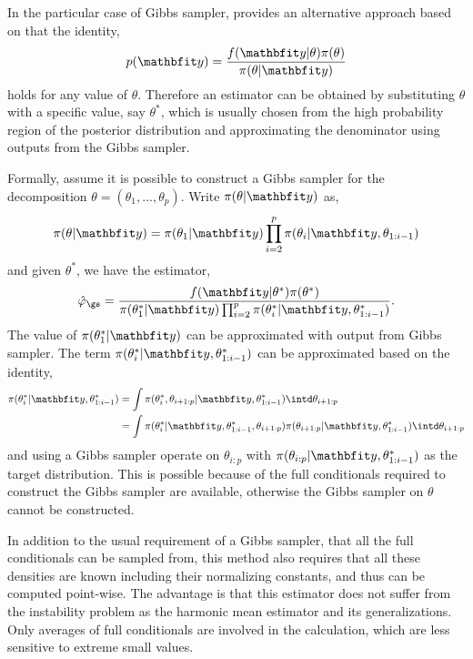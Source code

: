 In the particular case of Gibbs sampler, \cite{Chib:1995em} provides an
alternative approach based on that the identity,
\begin{equation}
  p(\data) = \frac{f(\data|\theta)\pi(\theta)}{\pi(\theta|\data)}
\end{equation}
holds for any value of $\theta$. Therefore an estimator can be obtained by
substituting $\theta$ with a specific value, say $\theta^*$, which is usually
chosen from the high probability region of the posterior distribution and
approximating the denominator using outputs from the Gibbs sampler.

Formally, assume it is possible to construct a Gibbs sampler for the
decomposition $\theta = (\theta_1,\dots,\theta_p)$. Write $\pi(\theta|\data)$
as,
\begin{equation}
  \pi(\theta|\data) = \pi(\theta_1|\data)
  \prod_{i=2}^p\pi(\theta_i|\data,\theta_{1:i-1})
\end{equation}
and given $\theta^*$, we have the estimator,
\begin{equation}
  \hat\varphi_{\gs} = \frac{f(\data|\theta^*)\pi(\theta^*)}
  {\pi(\theta_1^*|\data)
    \prod_{i=2}^p\pi(\theta_i^*|\data,\theta_{1:i-1}^*)}.
\end{equation}
The value of $\pi(\theta_1^*|\data)$ can be approximated with output from
Gibbs sampler. The term $\pi(\theta_i^*|\data,\theta_{1:i-1}^*)$ can be
approximated based on the identity,
\begin{align}
  \pi(\theta_i^*|\data,\theta_{1:i-1}^*)
  &= \int \pi(\theta_i^*,\theta_{i+1:p}|\data,\theta_{1:i-1}^*)
  \intd\theta_{i+1:p} \notag\\
  &= \int \pi(\theta_i^*|\data,\theta_{1:i-1}^*,\theta_{i+1:p})
  \pi(\theta_{i+1:p}|\data,\theta_{1:i-1}^*) \intd\theta_{i+1:p}
\end{align}
and using a Gibbs sampler operate on $\theta_{i:p}$ with
$\pi(\theta_{i:p}|\data,\theta_{1:i-1}^*)$ as the target distribution. This is
possible because of the full conditionals required to construct the Gibbs
sampler are available, otherwise the Gibbs sampler on $\theta$ cannot be
constructed.

In addition to the usual requirement of a Gibbs sampler, that all the full
conditionals can be sampled from, this method also requires that all these
densities are known including their normalizing constants, and thus can be
computed point-wise. The advantage is that this estimator does not suffer from
the instability problem as the harmonic mean estimator and its
generalizations. Only averages of full conditionals are involved in the
calculation, which are less sensitive to extreme small values.

